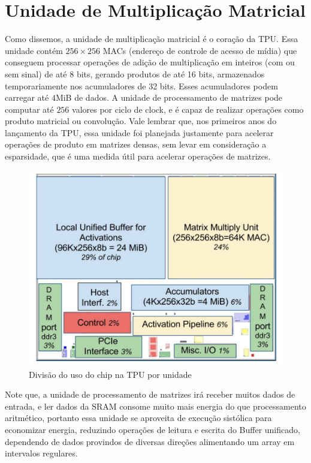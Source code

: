 \documentclass{report}
\begin{document}
\section{Unidade de Multiplicação Matricial}

Como dissemos, a unidade de multiplicação matricial é o coração da TPU. Essa unidade contém $256 \times 256$ MACs (endereço de controle de acesso de mídia) que conseguem processar operações de adição de multiplicação em inteiros (com ou sem sinal) de até 8 bits, gerando produtos de até 16 bits, armazenados temporariamente nos acumuladores de 32 bits. Esses acumuladores podem carregar até $4$MiB de dados. A unidade de processamento de matrizes pode computar até $256$ valores por ciclo de clock, e é capaz de realizar operações como produto matricial ou convolução. Vale lembrar que, nos primeiros anos do lançamento da TPU, essa unidade foi planejada justamente para acelerar operações de produto em matrizes densas, sem levar em consideração a esparsidade, que é uma medida útil para acelerar operações de matrizes.

\begin{figure}[h]
	\includegraphics[scale=0.7]{floor-plan}
	\centering
	\caption{Divisão do uso do chip na TPU por unidade}
\end{figure}

Note que, a unidade de processamento de matrizes irá receber muitos dados de entrada, e ler dados da SRAM consome muito mais energia do que processamento aritmético, portanto essa unidade se aproveita de execução sistólica para economizar energia, reduzindo operações de leitura e escrita do Buffer unificado, dependendo de dados provindos de diversas direções alimentando um array em intervalos regulares.
\end{document}
